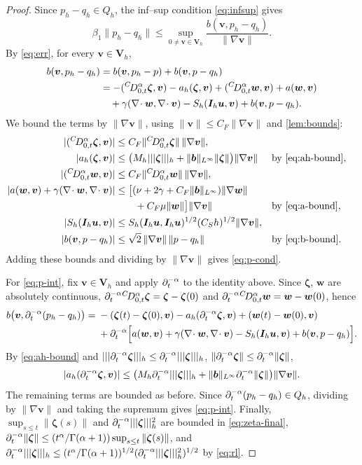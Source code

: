 \begin{proof}
Since $p_h-q_h\in Q_h$, the inf--sup condition \eqref{eq:infsup} gives
\[
\beta_1\|p_h-q_h\|\le\sup_{0\ne\bm v\in\bm V_h}\frac{b(\bm v,p_h-q_h)}{\|\nabla\bm v\|}.
\]
By \eqref{eq:err}, for every $\bm v\in\bm V_h$,
\[
\begin{aligned}
b(\bm v,p_h-q_h)&=b(\bm v,p_h-p)+b(\bm v,p-q_h)\\
&=-({}^{C}\!D_{0,t}^{\alpha}\bm\zeta,\bm v)-a_h(\bm\zeta,\bm v)+({}^{C}\!D_{0,t}^{\alpha}\bm w,\bm v)+a(\bm w,\bm v)\\
&\quad+\gamma(\nabla\!\cdot\bm w,\nabla\!\cdot\bm v)-S_h(\bm I_h\bm u,\bm v)+b(\bm v,p-q_h).
\end{aligned}
\]
We bound the terms by $\|\nabla\bm v\|$, using $\|\bm v\|\le C_F\|\nabla\bm v\|$ and \cref{lem:bounds}:
\[
\begin{aligned}
|({}^{C}\!D_{0,t}^{\alpha}\bm\zeta,\bm v)|&\le C_F\|{}^{C}\!D_{0,t}^{\alpha}\bm\zeta\|\,\|\nabla\bm v\|,\\
|a_h(\bm\zeta,\bm v)|&\le\bigl(M_h|||\bm\zeta|||_h+\|\boldsymbol b\|_{L^\infty}\|\bm\zeta\|\bigr)\|\nabla\bm v\| &&\text{by \eqref{eq:ah-bound}},\\
|({}^{C}\!D_{0,t}^{\alpha}\bm w,\bm v)|&\le C_F\|{}^{C}\!D_{0,t}^{\alpha}\bm w\|\,\|\nabla\bm v\|,\\
|a(\bm w,\bm v)+\gamma(\nabla\!\cdot\bm w,\nabla\!\cdot\bm v)|&\le\bigl[(\nu+2\gamma+C_F\|\boldsymbol b\|_{L^\infty})\|\nabla\bm w\|\\
&\qquad+C_F\mu\|\bm w\|\bigr]\|\nabla\bm v\| &&\text{by \eqref{eq:a-bound}},\\
|S_h(\bm I_h\bm u,\bm v)|&\le S_h(\bm I_h\bm u,\bm I_h\bm u)^{1/2}(C_Sh)^{1/2}\|\nabla\bm v\|,\\
|b(\bm v,p-q_h)|&\le\sqrt2\,\|\nabla\bm v\|\,\|p-q_h\| &&\text{by \eqref{eq:b-bound}}.
\end{aligned}
\]
Adding these bounds and dividing by $\|\nabla\bm v\|$ gives \eqref{eq:p-cond}.

For \eqref{eq:p-int}, fix $\bm v\in\bm V_h$ and apply $\partial_t^{-\alpha}$ to the identity above. Since $\bm\zeta$, $\bm w$ are absolutely continuous, $\partial_t^{-\alpha}{}^{C}\!D_{0,t}^{\alpha}\bm\zeta=\bm\zeta-\bm\zeta(0)$ and $\partial_t^{-\alpha}{}^{C}\!D_{0,t}^{\alpha}\bm w=\bm w-\bm w(0)$, hence
\[
\begin{aligned}
b\bigl(\bm v,\partial_t^{-\alpha}(p_h-q_h)\bigr)={}&-(\bm\zeta(t)-\bm\zeta(0),\bm v)-a_h(\partial_t^{-\alpha}\bm\zeta,\bm v)+(\bm w(t)-\bm w(0),\bm v)\\
&+\partial_t^{-\alpha}\Bigl[a(\bm w,\bm v)+\gamma(\nabla\!\cdot\bm w,\nabla\!\cdot\bm v)-S_h(\bm I_h\bm u,\bm v)+b(\bm v,p-q_h)\Bigr].
\end{aligned}
\]
By \eqref{eq:ah-bound} and $|||\partial_t^{-\alpha}\bm\zeta|||_h\le\partial_t^{-\alpha}|||\bm\zeta|||_h$, $\|\partial_t^{-\alpha}\bm\zeta\|\le\partial_t^{-\alpha}\|\bm\zeta\|$,
\[
|a_h(\partial_t^{-\alpha}\bm\zeta,\bm v)|\le\bigl(M_h\partial_t^{-\alpha}|||\bm\zeta|||_h+\|\boldsymbol b\|_{L^\infty}\partial_t^{-\alpha}\|\bm\zeta\|\bigr)\|\nabla\bm v\| .
\]
The remaining terms are bounded as before. Since $\partial_t^{-\alpha}(p_h-q_h)\in Q_h$, dividing by $\|\nabla\bm v\|$ and taking the supremum gives \eqref{eq:p-int}. Finally, $\sup_{s\le t}\|\bm\zeta(s)\|$ and $\partial_t^{-\alpha}|||\bm\zeta|||_h^2$ are bounded in \eqref{eq:zeta-final}, $\partial_t^{-\alpha}\|\bm\zeta\|\le(t^\alpha/\Gamma(\alpha+1))\sup_{s\le t}\|\bm\zeta(s)\|$, and $\partial_t^{-\alpha}|||\bm\zeta|||_h\le(t^\alpha/\Gamma(\alpha+1))^{1/2}(\partial_t^{-\alpha}|||\bm\zeta|||_h^2)^{1/2}$ by \eqref{eq:rl}.
\end{proof}
